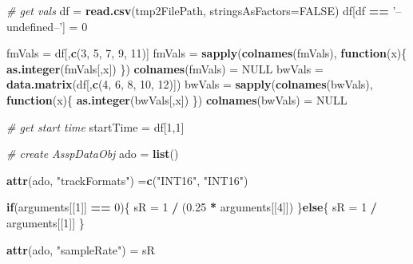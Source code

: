 \documentclass[]{book}
\newenvironment{Shaded}{\begin{snugshade}}{\end{snugshade}}
\newcommand{\CommentTok}[1]{\textcolor[rgb]{0.56,0.35,0.01}{\textit{#1}}}
\newcommand{\ControlFlowTok}[1]{\textcolor[rgb]{0.13,0.29,0.53}{\textbf{#1}}}
\newcommand{\DataTypeTok}[1]{\textcolor[rgb]{0.13,0.29,0.53}{#1}}
\newcommand{\DecValTok}[1]{\textcolor[rgb]{0.00,0.00,0.81}{#1}}
\newcommand{\FloatTok}[1]{\textcolor[rgb]{0.00,0.00,0.81}{#1}}
\newcommand{\KeywordTok}[1]{\textcolor[rgb]{0.13,0.29,0.53}{\textbf{#1}}}
\newcommand{\NormalTok}[1]{#1}
\newcommand{\OperatorTok}[1]{\textcolor[rgb]{0.81,0.36,0.00}{\textbf{#1}}}
\newcommand{\OtherTok}[1]{\textcolor[rgb]{0.56,0.35,0.01}{#1}}
\newcommand{\StringTok}[1]{\textcolor[rgb]{0.31,0.60,0.02}{#1}}
\begin{document}
\begin{Shaded}
\begin{Highlighting}[]
  \CommentTok{# get vals}
\NormalTok{  df =}\StringTok{ }\KeywordTok{read.csv}\NormalTok{(tmp2FilePath, }\DataTypeTok{stringsAsFactors=}\OtherTok{FALSE}\NormalTok{)}
\NormalTok{  df[df }\OperatorTok{==}\StringTok{ '--undefined--'}\NormalTok{] =}\StringTok{ }\DecValTok{0}
  
\NormalTok{  fmVals =}\StringTok{ }\NormalTok{df[,}\KeywordTok{c}\NormalTok{(}\DecValTok{3}\NormalTok{, }\DecValTok{5}\NormalTok{, }\DecValTok{7}\NormalTok{, }\DecValTok{9}\NormalTok{, }\DecValTok{11}\NormalTok{)]}
\NormalTok{  fmVals =}\StringTok{ }\KeywordTok{sapply}\NormalTok{(}\KeywordTok{colnames}\NormalTok{(fmVals), }\ControlFlowTok{function}\NormalTok{(x)\{}
    \KeywordTok{as.integer}\NormalTok{(fmVals[,x])}
\NormalTok{    \})}
  \KeywordTok{colnames}\NormalTok{(fmVals) =}\StringTok{ }\OtherTok{NULL}
\NormalTok{  bwVals =}\StringTok{ }\KeywordTok{data.matrix}\NormalTok{(df[,}\KeywordTok{c}\NormalTok{(}\DecValTok{4}\NormalTok{, }\DecValTok{6}\NormalTok{, }\DecValTok{8}\NormalTok{, }\DecValTok{10}\NormalTok{, }\DecValTok{12}\NormalTok{)])}
\NormalTok{  bwVals =}\StringTok{ }\KeywordTok{sapply}\NormalTok{(}\KeywordTok{colnames}\NormalTok{(bwVals), }\ControlFlowTok{function}\NormalTok{(x)\{}
    \KeywordTok{as.integer}\NormalTok{(bwVals[,x])}
\NormalTok{    \})}
  \KeywordTok{colnames}\NormalTok{(bwVals) =}\StringTok{ }\OtherTok{NULL}
  
  \CommentTok{# get start time}
\NormalTok{  startTime =}\StringTok{ }\NormalTok{df[}\DecValTok{1}\NormalTok{,}\DecValTok{1}\NormalTok{]}

  \CommentTok{# create AsspDataObj}
\NormalTok{  ado =}\StringTok{ }\KeywordTok{list}\NormalTok{()}
  
  \KeywordTok{attr}\NormalTok{(ado, }\StringTok{"trackFormats"}\NormalTok{) =}\KeywordTok{c}\NormalTok{(}\StringTok{"INT16"}\NormalTok{, }\StringTok{"INT16"}\NormalTok{)}
  
  \ControlFlowTok{if}\NormalTok{(arguments[[}\DecValTok{1}\NormalTok{]] }\OperatorTok{==}\StringTok{ }\DecValTok{0}\NormalTok{)\{}
\NormalTok{    sR =}\StringTok{ }\DecValTok{1} \OperatorTok{/}\StringTok{ }\NormalTok{(}\FloatTok{0.25} \OperatorTok{*}\StringTok{ }\NormalTok{arguments[[}\DecValTok{4}\NormalTok{]])}
\NormalTok{  \}}\ControlFlowTok{else}\NormalTok{\{}
\NormalTok{    sR =}\StringTok{ }\DecValTok{1} \OperatorTok{/}\StringTok{ }\NormalTok{arguments[[}\DecValTok{1}\NormalTok{]]}
\NormalTok{  \}}
  
  \KeywordTok{attr}\NormalTok{(ado, }\StringTok{"sampleRate"}\NormalTok{) =}\StringTok{ }\NormalTok{sR}
  

\end{Highlighting}
\end{Shaded}
\end{document}
